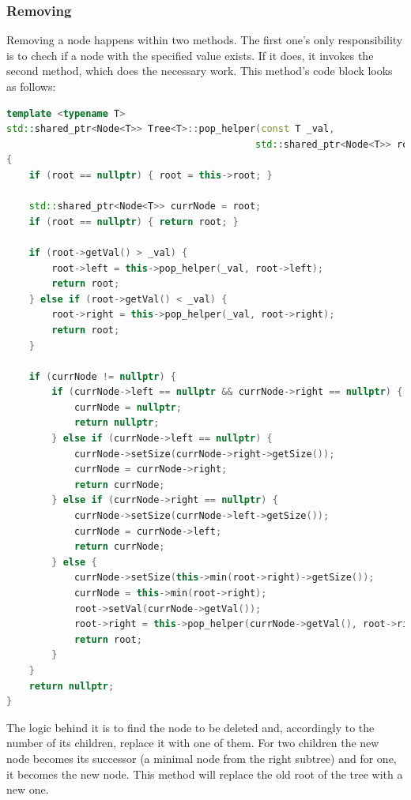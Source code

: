 \documentclass[12pt]{article}
\begin{document}
\subsubsection{Removing}
Removing a node happens within two methods. The first one's only responsibility is to chech if a node with the specified value exists. If it does, it invokes the second method, which does the necessary work. This method's code block looks as follows:
\begin{footnotesize}
\begin{lstlisting}[language=C++]
template <typename T>
std::shared_ptr<Node<T>> Tree<T>::pop_helper(const T _val, 
                                            std::shared_ptr<Node<T>> root) 
{
    if (root == nullptr) { root = this->root; }

    std::shared_ptr<Node<T>> currNode = root;
    if (root == nullptr) { return root; }

    if (root->getVal() > _val) {
        root->left = this->pop_helper(_val, root->left);
        return root;
    } else if (root->getVal() < _val) {
        root->right = this->pop_helper(_val, root->right);
        return root;
    }

    if (currNode != nullptr) {
        if (currNode->left == nullptr && currNode->right == nullptr) {
            currNode = nullptr;
            return nullptr;
        } else if (currNode->left == nullptr) {
            currNode->setSize(currNode->right->getSize());  
            currNode = currNode->right;                    
            return currNode;
        } else if (currNode->right == nullptr) {
            currNode->setSize(currNode->left->getSize());
            currNode = currNode->left;                    
            return currNode;
        } else {                                         
            currNode->setSize(this->min(root->right)->getSize());
            currNode = this->min(root->right);
            root->setVal(currNode->getVal());
            root->right = this->pop_helper(currNode->getVal(), root->right);
            return root;
        }
    }
    return nullptr;
}
\end{lstlisting}
\end{footnotesize}
\pagebreak

The logic behind it is to find the node to be deleted and, accordingly to the number of its children, replace it with one of them. For two children the new node becomes its successor (a minimal node from the right subtree) and for one, it becomes the new node. This method will replace the old root of the tree with a new one.
\end{document}
